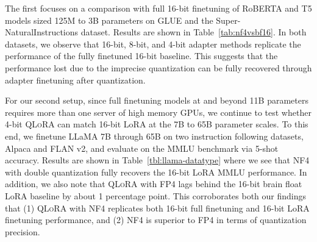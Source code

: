 \documentclass{article}
\newcommand{\method}{\textsc{QLoRA}\xspace}
\begin{document}
The first focuses on a comparison with full 16-bit finetuning of RoBERTA and T5 models sized 125M to 3B parameters on GLUE and the Super-NaturalInstructions dataset. Results are shown in Table~\ref{tab:nf4vsbf16}. In both datasets, we observe that 16-bit, 8-bit, and 4-bit adapter methods replicate the performance of the fully finetuned 16-bit baseline. This suggests that the performance lost due to the imprecise quantization can be fully recovered through adapter finetuning after quantization.

For our second setup, since full finetuning models at and beyond 11B parameters requires more than one server of high memory GPUs, we continue to test whether 4-bit \method can match 16-bit LoRA at the 7B to 65B parameter scales. To this end, we finetune LLaMA 7B through 65B on two instruction following datasets, Alpaca and FLAN v2, and evaluate on the MMLU benchmark via 5-shot accuracy.
Results are shown in Table~\ref{tbl:llama-datatype} where we see that NF4 with double quantization fully recovers the 16-bit LoRA MMLU performance. In addition, we also note that \method with FP4 lags behind the 16-bit brain float LoRA baseline by about 1 percentage point. This corroborates both our findings that (1) \method with NF4 replicates both 16-bit full finetuning and 16-bit LoRA finetuning performance, and (2) NF4 is superior to FP4 in terms of quantization precision.
\end{document}
